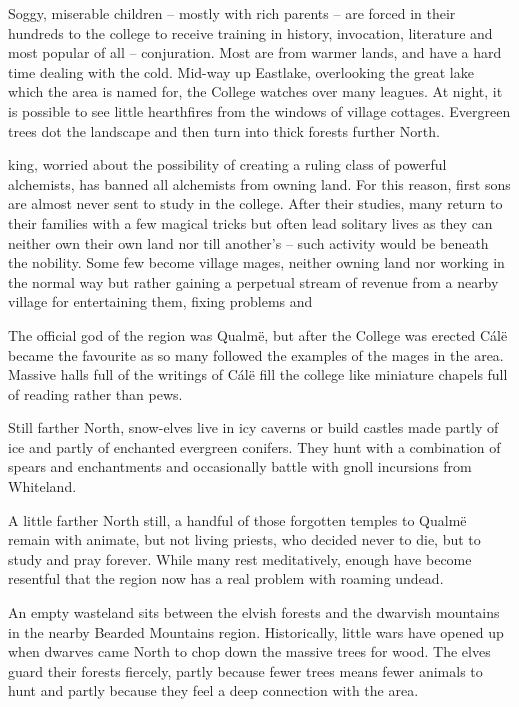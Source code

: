 \begin{multicols}{2}
Soggy, miserable children -- mostly with rich parents -- are forced in their hundreds to the \gls{college} to receive training in history, invocation, literature and most popular of all -- conjuration.
Most are from warmer lands, and have a hard time dealing with the cold.
Mid-way up Eastlake, overlooking the great lake which the area is named for, the College watches over many leagues.
At night, it is possible to see little hearthfires from the windows of village cottages.
Evergreen trees dot the landscape and then turn into thick forests further North.

\Gls{king}, worried about the possibility of creating a ruling class of powerful alchemists, has banned all alchemists from owning land.
For this reason, first sons are almost never sent to study in the college.
After their studies, many return to their families with a few magical tricks but often lead solitary lives as they can neither own their own land nor till another's -- such activity would be beneath the nobility.
Some few become village mages, neither owning land nor working in the normal way but rather gaining a perpetual stream of revenue from a nearby village for entertaining them, fixing problems and 

The official god of the region was Qualm\"{e}, but after the College was erected C\'{a}l\"{e} became the favourite as so many followed the examples of the mages in the area.
Massive halls full of the writings of C\'{a}l\"{e} fill the college like miniature chapels full of reading rather than pews.

Still farther North, snow-elves live in icy caverns or build castles made partly of ice and partly of enchanted evergreen conifers.
They hunt with a combination of spears and enchantments and occasionally battle with gnoll incursions from Whiteland.

A little farther North still, a handful of those forgotten temples to Qualm\"{e} remain with animate, but not living priests, who decided never to die, but to study and pray forever.
While many rest meditatively, enough have become resentful that the region now has a real problem with roaming undead.

An empty wasteland sits between the elvish forests and the dwarvish mountains in the nearby Bearded Mountains region.
Historically, little wars have opened up when dwarves came North to chop down the massive trees for wood.
The elves guard their forests fiercely, partly because fewer trees means fewer animals to hunt and partly because they feel a deep connection with the area.


\end{multicols}
